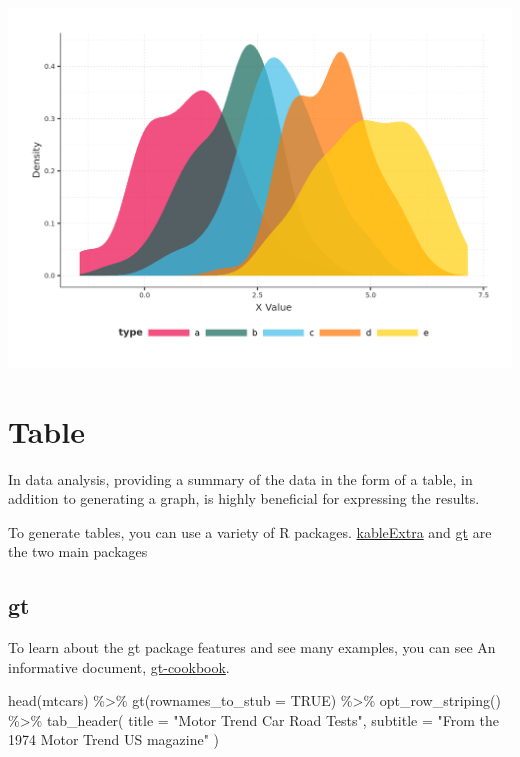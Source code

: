 \documentclass[
]{book}
\newenvironment{Shaded}{\begin{snugshade}}{\end{snugshade}}
\newcommand{\AttributeTok}[1]{\textcolor[rgb]{0.77,0.63,0.00}{#1}}
\newcommand{\ConstantTok}[1]{\textcolor[rgb]{0.00,0.00,0.00}{#1}}
\newcommand{\FunctionTok}[1]{\textcolor[rgb]{0.00,0.00,0.00}{#1}}
\newcommand{\NormalTok}[1]{#1}
\newcommand{\SpecialCharTok}[1]{\textcolor[rgb]{0.00,0.00,0.00}{#1}}
\newcommand{\StringTok}[1]{\textcolor[rgb]{0.31,0.60,0.02}{#1}}
\begin{document}
\begin{center}\includegraphics{figures/mpithemes_theme_scientific-1} \end{center}

\hypertarget{table-1}{%
\chapter{Table}\label{table-1}}

In data analysis, providing a summary of the data in the form of a table, in addition to generating a graph, is highly beneficial for expressing the results.

To generate tables, you can use a variety of R packages.
\href{https://haozhu233.github.io/kableExtra/}{kableExtra} and \href{https://gt.rstudio.com/}{gt} are the two main packages

\hypertarget{gt}{%
\section{gt}\label{gt}}

To learn about the gt package features and see many examples, you can see
An informative document, \href{https://themockup.blog/static/gt-cookbook.html\#Introduction}{gt-cookbook}.

\begin{Shaded}
\begin{Highlighting}[]
\FunctionTok{head}\NormalTok{(mtcars) }\SpecialCharTok{\%\textgreater{}\%} 
  \FunctionTok{gt}\NormalTok{(}\AttributeTok{rownames\_to\_stub =} \ConstantTok{TRUE}\NormalTok{) }\SpecialCharTok{\%\textgreater{}\%} 
  \FunctionTok{opt\_row\_striping}\NormalTok{() }\SpecialCharTok{\%\textgreater{}\%} 
  \FunctionTok{tab\_header}\NormalTok{(}
    \AttributeTok{title =} \StringTok{"Motor Trend Car Road Tests"}\NormalTok{,}
    \AttributeTok{subtitle =} \StringTok{"From the 1974 Motor Trend US magazine"}
\NormalTok{  )}
\end{Highlighting}
\end{Shaded}
\end{document}
